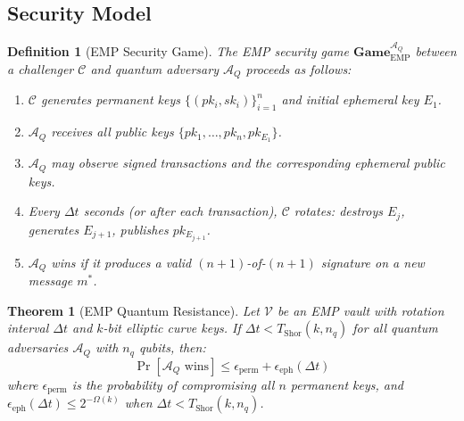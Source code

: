 \documentclass[12pt, a4paper, twocolumn]{article}
\newtheorem{definition}{Definition}
\newtheorem{theorem}{Theorem}
\begin{document}
\subsection{Security Model}

\begin{definition}[EMP Security Game]
The EMP security game $\textbf{Game}_{\text{EMP}}^{\mathcal{A}_Q}$ between a challenger $\mathcal{C}$ and quantum adversary $\mathcal{A}_Q$ proceeds as follows:
\begin{enumerate}[noitemsep]
  \item $\mathcal{C}$ generates permanent keys $\{(pk_i, sk_i)\}_{i=1}^{n}$ and initial ephemeral key $E_1$.
  \item $\mathcal{A}_Q$ receives all public keys $\{pk_1, \ldots, pk_n, pk_{E_1}\}$.
  \item $\mathcal{A}_Q$ may observe signed transactions and the corresponding ephemeral public keys.
  \item Every $\Delta t$ seconds (or after each transaction), $\mathcal{C}$ rotates: destroys $E_j$, generates $E_{j+1}$, publishes $pk_{E_{j+1}}$.
  \item $\mathcal{A}_Q$ wins if it produces a valid $(n+1)$-of-$(n+1)$ signature on a new message $m^*$.
\end{enumerate}
\end{definition}

\begin{theorem}[EMP Quantum Resistance]
\label{thm:emp_main}
Let $\mathcal{V}$ be an EMP vault with rotation interval $\Delta t$ and $k$-bit elliptic curve keys. If $\Delta t < T_{\text{Shor}}(k, n_q)$ for all quantum adversaries $\mathcal{A}_Q$ with $n_q$ qubits, then:
\[
\Pr\!\left[\mathcal{A}_Q \text{ wins}\right] \leq \epsilon_{\text{perm}} + \epsilon_{\text{eph}}(\Delta t)
\]
where $\epsilon_{\text{perm}}$ is the probability of compromising all $n$ permanent keys, and $\epsilon_{\text{eph}}(\Delta t) \leq 2^{-\Omega(k)}$ when $\Delta t < T_{\text{Shor}}(k, n_q)$.
\end{theorem}
\end{document}
